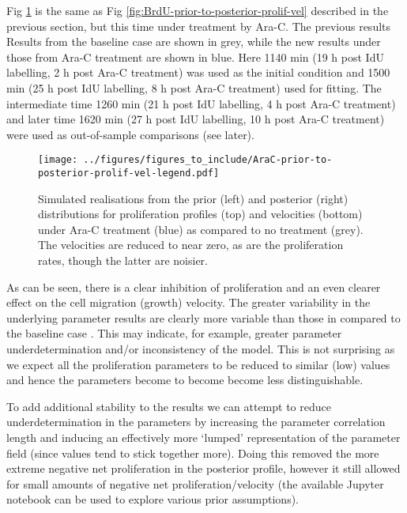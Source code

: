 \documentclass[10pt,letterpaper]{article}
\providecommand{\DIFaddtex}[1]{{\protect\color{blue} \sf #1}} %
\providecommand{\DIFdeltex}[1]{{\protect\color{red} \scriptsize #1}} %
\providecommand{\DIFaddbegin}{} %
\providecommand{\DIFaddend}{} %
\providecommand{\DIFdelbegin}{} %
\providecommand{\DIFdelend}{} %
\providecommand{\DIFadd}[1]{\texorpdfstring{\DIFaddtex{#1}}{#1}} %
\providecommand{\DIFdel}[1]{\texorpdfstring{\DIFdeltex{#1}}{}} %
\begin{document}
Fig \ref{fig:AraC-prior-to-posterior-prolif-vel} is the same as Fig
\ref{fig:BrdU-prior-to-posterior-prolif-vel} described in the previous
section, but this time under treatment by Ara-C. \DIFdelbegin \DIFdel{The previous results
}\DIFdelend \DIFaddbegin \DIFadd{Results }\DIFaddend from the
baseline case are shown in grey, while \DIFdelbegin \DIFdel{the new results under
}\DIFdelend \DIFaddbegin \DIFadd{those from }\DIFaddend Ara-C treatment are
shown in blue. Here 1140 min (19 h post IdU labelling, 2 h post Ara-C
treatment) was used as the initial condition and 1500 min (25 h post IdU
labelling, 8 h post Ara-C treatment) used for fitting. The intermediate
time 1260 min (21 h post IdU labelling, 4 h post Ara-C treatment) and
later time 1620 min (27 h post IdU labelling, 10 h post Ara-C treatment)
were used as out-of-sample comparisons (see later).

\begin{figure}
\centering
\texttt{[image: ../figures/figures\_to\_include/AraC-prior-to-posterior-prolif-vel-legend.pdf]}
\caption{Simulated realisations from the prior (left) and posterior
(right) distributions for proliferation profiles (top) and velocities
(bottom) under Ara-C treatment (blue) as compared to no treatment
(grey). The velocities are reduced to near zero, as are the
proliferation rates, though the latter are
noisier.\label{fig:AraC-prior-to-posterior-prolif-vel}}
\end{figure}

As can be seen, there is \DIFdelbegin \DIFdel{a }\DIFdelend clear inhibition of proliferation and an even
clearer effect on the \DIFaddbegin \DIFadd{cell }\DIFaddend migration (growth) velocity. The \DIFaddbegin \DIFadd{greater
variability in the }\DIFaddend underlying parameter results \DIFdelbegin \DIFdel{are clearly more variable than those in }\DIFdelend \DIFaddbegin \DIFadd{compared to }\DIFaddend the baseline
case \DIFdelbegin \DIFdel{. This }\DIFdelend may indicate, for example, greater parameter underdetermination
and/or inconsistency of the model. This is not surprising as we expect
all \DIFdelbegin \DIFdel{the }\DIFdelend proliferation parameters to be reduced to similar (low) values and
hence \DIFdelbegin \DIFdel{the parameters become }\DIFdelend \DIFaddbegin \DIFadd{to become become }\DIFaddend less distinguishable.

To add additional stability to the results we can attempt to reduce
underdetermination in the parameters by increasing the parameter
correlation length and inducing an effectively more `lumped'
representation of the parameter field (since values tend to stick
together more). Doing this removed the more extreme negative net
proliferation in the posterior profile, however it still allowed for
small amounts of negative net proliferation/velocity (the available
Jupyter notebook can be used to explore various prior assumptions).
\end{document}
